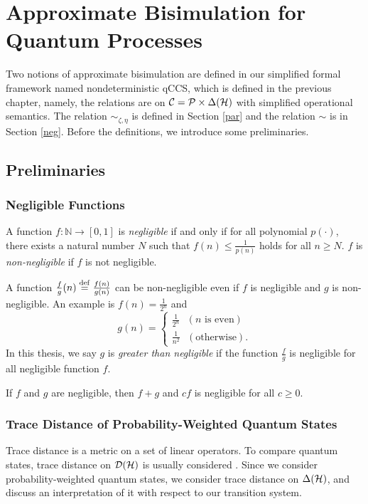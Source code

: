 \chapter{Approximate Bisimulation for Quantum Processes}
\label{prob_bisim}
Two notions of approximate bisimulation
are defined in our simplified formal framework named 
nondeterministic qCCS, which is 
defined in the previous chapter, namely, the 
relations are on $\mathcal{C} = \mathcal{P} \times \Delta(\mathcal{H})$
with simplified operational semantics.
The relation $\sim_{\zeta, \eta}$ is defined in Section \ref{par} and
the relation $\sim$ is in Section \ref{neg}.
Before the definitions, we introduce some preliminaries.

\section{Preliminaries}
\subsection{Negligible Functions}
\begin{defi}
 A function $f:\mathbb{N}\rightarrow [0, 1]$ is \emph{negligible} if and
 only if for all polynomial $p(\cdot)$, there exists a natural number
 $N$ such that $f(n) \le \frac{1}{p(n)}$ holds
 for all $n \ge N$. $f$ is
 \emph{non-negligible} if $f$ is not negligible.
\end{defi}
\begin{rem}
 A function $\frac{f}{g}(n) \overset{\mathrm{def}}{=} \frac{f(n)}{g(n)}$ can be
 non-negligible even if $f$ is negligible and $g$ is non-negligible.
 An example is $f(n) = \frac{1}{2^n}$ and
\begin{displaymath}
 g(n) = \left\{
\begin{array}{l}
\frac{1}{2^n}~~~(n \mbox{ is even})\\
\frac{1}{n^2}~~~(\mbox{otherwise}).
\end{array}
\right.
\end{displaymath}
 In this thesis, we say $g$ is \emph{greater than negligible} if the
 function
 $\frac{f}{g}$ is negligible for all
 negligible function $f$.
\end{rem}

\begin{prop}
\label{par:propneg}
 If $f$ and $g$ are negligible, then $f + g$ and $cf$ is negligible for
 all $c \ge 0$.
\end{prop}

\subsection{Trace Distance of Probability-Weighted Quantum States}
Trace distance is a metric on a set of
linear operators.
To compare quantum states, trace distance on $\mathcal{D}(\mathcal{H})$
is usually considered \cite[Chapter
9]{NielsenChuang-Kimura2004}.
Since we consider probability-weighted quantum states, 
we consider trace distance on $\Delta(\mathcal{H})$, and discuss an
interpretation of it with respect to our transition system.

